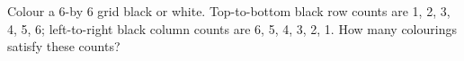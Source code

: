 Colour a 6-by 6 grid black or white. Top-to-bottom black row counts are 1, 2, 3, 4, 5, 6; left-to-right black column counts are 6, 5, 4, 3, 2, 1. How many colourings satisfy these counts?
